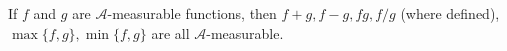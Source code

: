 If $f$ and $g$ are $\mathcal{A}$-measurable functions, then $f + g, f - g, fg, f/g$ (where defined), $\max\{f, g\}, \min\{f, g\}$ are all $\mathcal{A}$-measurable.
